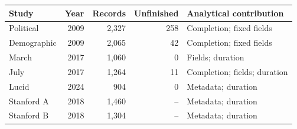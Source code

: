 \begin{tabular}{lrrrl}
\toprule
Study & Year & Records & Unfinished & Analytical contribution \\
\midrule
Political & 2009 & 2,327 & 258 & Completion; fixed fields \\
Demographic & 2009 & 2,065 & 42 & Completion; fixed fields \\
March & 2017 & 1,060 & 0 & Fields; duration \\
July & 2017 & 1,264 & 11 & Completion; fields; duration \\
Lucid & 2024 & 904 & 0 & Metadata; duration \\
Stanford A & 2018 & 1,460 & -- & Metadata; duration \\
Stanford B & 2018 & 1,304 & -- & Metadata; duration \\
\bottomrule
\end{tabular}
